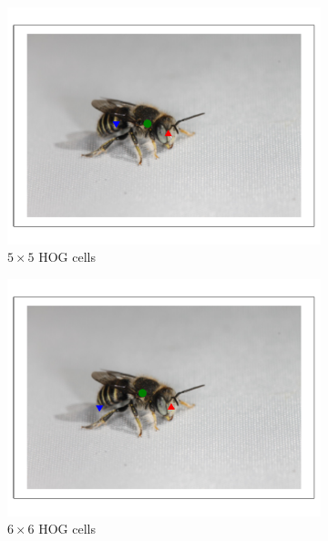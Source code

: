 \documentclass[11pt, oneside]{report}
\begin{document}
\begin{figure}[p]
\begin{subfigure}[b]{0.3\textwidth}
                \centering
                \includegraphics[width=\textwidth]{hog5_1.pdf}
                \caption{$5\times5$ HOG cells}
            \end{subfigure}
            \begin{subfigure}[b]{0.3\textwidth}
                \centering
                \includegraphics[width=\textwidth]{hog6_1.pdf}
                \caption{$6\times6$ HOG cells}
            \end{subfigure}
            \begin{subfigure}[b]{0.3\textwidth}
                \centering

\end{subfigure}
\end{figure}
\end{document}
